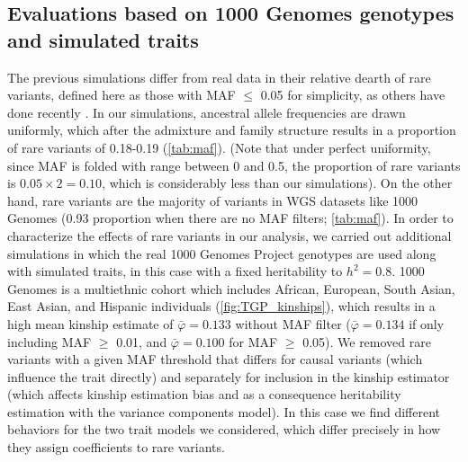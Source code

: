 \documentclass[11pt]{article}
\begin{document}
\subsection{Evaluations based on 1000 Genomes genotypes and simulated traits}

The previous simulations differ from real data in their relative dearth of rare variants, defined here as those with MAF $\le$ 0.05 for simplicity, as others have done recently \citep{biddanda2020variant}.
In our simulations, ancestral allele frequencies are drawn uniformly, which after the admixture and family structure results in a proportion of rare variants of 0.18-0.19 (\cref{tab:maf}).
(Note that under perfect uniformity, since MAF is folded with range between 0 and 0.5, the proportion of rare variants is $0.05 \times 2 = 0.10$, which is considerably less than our simulations). 
On the other hand, rare variants are the majority of variants in WGS datasets like 1000 Genomes (0.93 proportion when there are no MAF filters; \cref{tab:maf}).  In order to characterize the effects of rare variants in our analysis, we carried out additional simulations in which the real 1000 Genomes Project genotypes are used along with simulated traits, in this case with a fixed heritability to $h^2 = 0.8$.  1000 Genomes is a multiethnic cohort which includes African, European, South Asian, East Asian, and Hispanic individuals (\cref{fig:TGP_kinships}), which results in a high mean kinship estimate of $\bar{\varphi} = 0.133$ without MAF filter ($\bar{\varphi} = 0.134$ if only including MAF $\ge$ 0.01, and $\bar{\varphi} = 0.100$ for MAF $\ge$ 0.05).  We removed rare variants with a given MAF threshold that differs for causal variants (which influence the trait directly) and separately for inclusion in the kinship estimator (which affects kinship estimation bias and as a consequence heritability estimation with the variance components model).  In this case we find different behaviors for the two trait models we considered, which differ precisely in how they assign coefficients to rare variants.
\end{document}
